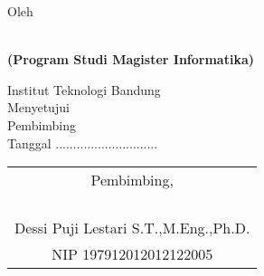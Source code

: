 \clearpage
\pagestyle{empty}

\begin{center}
\smallskip

    \singlespacing
    \large \bfseries \MakeUppercase{\thetitle}
    \vfill

    \normalsize \normalfont Oleh

    \bfseries \large \theauthor\\
    \normalsize (Program Studi Magister Informatika)

    \normalsize \normalfont Institut Teknologi Bandung \\

    \vfill
    \normalsize \normalfont
    Menyetujui\\
    Pembimbing\\
    \bigskip
    Tanggal .............................

    \vfill
    \setlength{\tabcolsep}{12pt}
    \begin{tabular}{c}
        Pembimbing, \\
        \\
        \\
        \\
        \\
        Dessi Puji Lestari S.T.,M.Eng.,Ph.D. \\
        NIP 197912012012122005 \\
    \end{tabular}

\end{center}
\clearpage
